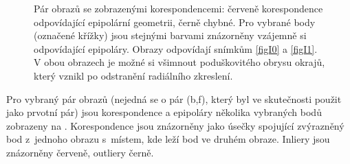 \documentclass[11pt,oneside,a4paper,pdftex]{article}   %
\begin{document}
			\begin{figure}[htb]
					\centering
				\caption{Pár obrazů se zobrazenými korespondencemi: červeně korespondence odpovídající
					epipolární geometrii, černě chybné. Pro vybrané body (označené křížky) jsou
					stejnými barvami znázorněny vzájemně si odpovídající epipoláry. Obrazy
					odpovídají snímkům \ref{figI0} a \ref{figI1}. V obou obrazech je možné
					si všimnout poduškovitého obrysu okrajů, který vznikl po odstranění
					radiálního zkreslení.}
				\label{figKorespondenceAEpipolary}
			\end{figure}
	
		Pro vybraný pár obrazů (nejedná se o pár (b,f), který byl ve skutečnosti použit jako prvotní pár)
		jsou korespondence a epipoláry ně\-ko\-li\-ka vy\-bra\-ných bodů zobrazeny na
		. Korespondence jsou znázorněny jako úsečky spo\-ju\-jí\-cí
		zvýrazněný bod z~jednoho obrazu s~místem, kde leží bod ve druhém obraze. Inliery jsou znázorněny
		červeně, outliery černě.
		
\end{document}
